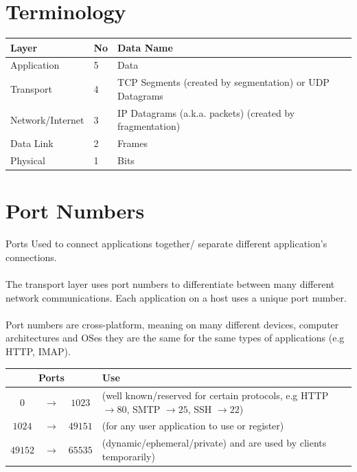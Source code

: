 \section{Terminology}
\begin{center}
    \begin{tabular}{l l l}
        \textbf{Layer}   & \textbf{No} & \textbf{Data Name}                                       \\
        \hline
        Application      & 5           & Data                                                     \\
        Transport        & 4           & TCP Segments (created by segmentation) or UDP Datagrams  \\
        Network/Internet & 3           & IP Datagrams (a.k.a. packets) (created by fragmentation) \\
        Data Link        & 2           & Frames                                                   \\
        Physical         & 1           & Bits                                                     \\
    \end{tabular}
\end{center}

\section{Port Numbers}
\begin{definitionbox}{Ports}
    Used to connect applications together/ separate different application's connections.
    \\
    \\ The transport layer uses port numbers to differentiate between many different network communications. Each application on a host uses a unique port number.
    \\
    \\ Port numbers are cross-platform, meaning on many different devices, computer architectures and OSes they are the same for the same types of applications (e.g HTTP, IMAP).
    \begin{center}
        \begin{tabular}{c c c l}
            \multicolumn{3}{c}{\textbf{Ports}} & \textbf{Use}                                                                                                         \\
            \hline
            $0$                                & $\to$        & $1023$  & (well known/reserved for certain protocols, e.g HTTP $\to 80$, SMTP $\to 25$, SSH $\to 22$) \\
            $1024$                             & $\to$        & $49151$ & (for any user application to use or register)                                               \\
            $49152$                            & $\to$        & $65535$ & (dynamic/ephemeral/private) and are used by clients temporarily)                            \\
        \end{tabular}
    \end{center}
\end{definitionbox}

